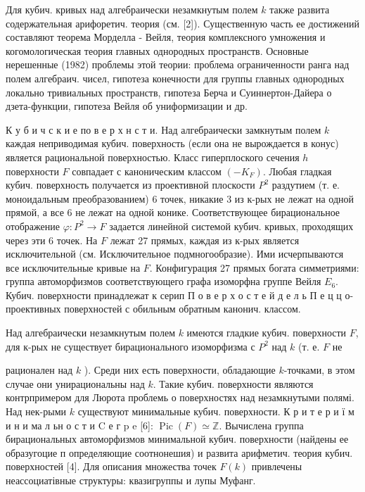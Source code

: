 \documentclass[10pt]{article}
\begin{document}
Для кубич. кривых над алгебраически незамкнутым полем $k$ также развита содержательная арифоретич. теория (см. [2]). Существенную часть ее достижений составляют теорема Морделла - Вейля, теория комплексного умножения и когомологическая теория главных однородных пространств. Основные нерешенные (1982) проблемы этой теории: проблема ограниченности ранга над полем алгебраич. чисел, гипотеза конечности для группы главных однородных локально тривиальных пространств, гипотеза Берча и Суиннертон-Дайера о дзета-функции, гипотеза Вейля об униформизации и др.



К у б и ч с к и е по в е р х н с т и. Над алгебраически замкнутым полем $k$ каждая неприводимая кубич. поверхность (если она не вырождается в конус) является рациональной поверхностью. Класс гиперплоского сечения $h$ поверхности $F$ совпадает с каноническим классом $\left(-K_{F}\right)$. Любая гладкая кубич. поверхность получается из проективной плоскости $P^{2}$ раздутием (т. е. моноидальным преобразованием) 6 точек, никакие 3 из к-рых не лежат на одной прямой, а все 6 не лежат на одной конике. Соответствующее бирациональное отображение $\varphi: P^{2} \rightarrow F$ задается линейной системой кубич. кривых, проходящих через эти 6 точек. На $F$ лежат 27 прямых, каждая из к-рых является исключительной (см. Исключительное подмногообразие). Ими исчерпываются все исключительные кривые на $F$. Конфигурация 27 прямых богата симметриями: группа автоморфизмов соответствующего графа изоморфна группе Вейля $E_{6}$. Кубич. поверхности принадлежат к серип П о в е р х о с т е й д е л ь П е ц ц о- проективных поверхностей с обильным обратным канонич. классом.



Над алгебраически незамкнутым полем $k$ имеются гладкие кубич. поверхности $F$, для к-рых не существует бирационального изоморфизма с $P^{2}$ над $k$ (т. е. $F$ не



рационален над $k$ ). Среди них есть поверхности, обладающие $k$-точками, в этом случае они унирациональны над $k$. Такие кубич. поверхности являются контрпримером для Люрота проблемь о поверхностях над незамкнутыми полямі. Над нек-рыми $k$ существуют минимальные кубич. поверхности. К р и т е р и ї м и н и ма л ьн о с т и $\mathrm{C}$ е г p e [6]: $\operatorname{Pic}(F) \simeq \mathbb{Z}$. Вычислена группа бирациональных автоморфизмов минимальной кубич. поверхности (найдены ее образугоцие п определяющие соотнонешия) и развита арифметич. теория кубич. поверхностей [4]. Для описания множества точек $F(k)$ привлечены неассоциатівные структуры: квазигруппы и лупы Муфанг.
\end{document}
